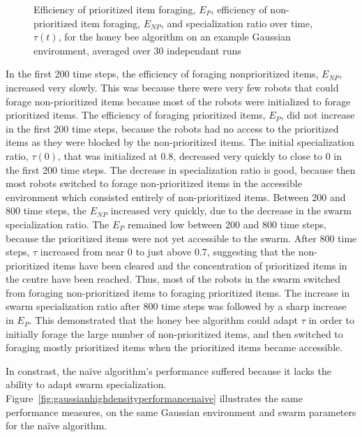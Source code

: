 \documentclass[preprint,12pt]{elsarticle}
\begin{document}
\begin{figure}[htb]
\centering
\small
\resizebox{\textwidth}{!}{}
\caption{Efficiency of prioritized item foraging, $E_P$, efficiency of non-prioritized item foraging, $E_{NP}$, and specialization ratio over time, $\tau(t)$, for the honey bee algorithm on an example Gaussian environment, averaged over 30 independant runs}
\label{fig:gaussianhighdensityperformancehoneybee}
\end{figure}

In the first 200 time steps, the efficiency of foraging nonprioritized items, $E_{NP}$, increased very slowly. This was because there were very few robots that could forage non-prioritized items because most of the robots were initialized to forage prioritized items. The efficiency of foraging prioritized items, $E_{P}$, did not increase in the first 200 time steps, because the robots had no access to the prioritized items as they were blocked by the non-prioritized items. The initial specialization ratio, $\tau(0)$, that was initialized at 0.8, decreased very quickly to close to 0 in the first 200 time steps. The decrease in specialization ratio is good, because then most robots switched to forage non-prioritized items in the accessible environment which consisted entirely of non-prioritized items. Between 200 and 800 time steps, the $E_{NP}$ increased very quickly, due to the decrease in the swarm specialization ratio. The $E_{P}$ remained low between 200 and 800 time steps, because the prioritized items were not yet accessible to the swarm. After 800 time steps, $\tau$ increased from near 0 to just above 0.7, suggesting that the non-prioritized items have been cleared and the concentration of prioritized items in the centre have been reached. Thus, most of the robots in the swarm switched from foraging non-prioritized items to foraging prioritized items. The increase in swarm specialization ratio after 800 time steps was followed by a sharp increase in $E_P$. This demonstrated that the honey bee algorithm could adapt $\tau$ in order to initially forage the large number of non-prioritized items, and then switched to foraging mostly prioritized items when the prioritized items became accessible.

In constrast, the na\"ive algorithm's performance suffered because it lacks the ability to adapt swarm specialization. Figure~\ref{fig:gaussianhighdensityperformancenaive} illustrates the same performance measures, on the same Gaussian environment and swarm parameters for the na\"ive algorithm.  
\end{document}

